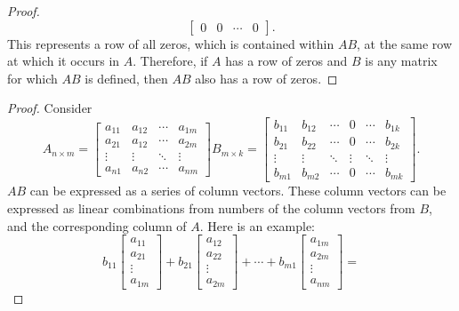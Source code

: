 \documentclass{article}
\begin{document}
\begin{enumerate}
{\begin{enumerate}
\begin{proof}
\[          \begin{bmatrix} 0 & 0 & \cdots & 0 \end{bmatrix}.
        \]
        This represents a row of all zeros, which is contained within $AB$, at the same row at which it occurs in $A$. Therefore, if $A$ has a row of zeros and $B$ is any matrix for which $AB$ is defined, then $AB$ also has a row of zeros.
      \end{proof}
      \begin{proof}
        Consider
        \[
          A_{n \times m} = \begin{bmatrix}
            a_{11} & a_{12} & \cdots & a_{1m} \\
            a_{21} & a_{12} & \cdots & a_{2m} \\
            \vdots & \vdots & \ddots & \vdots \\
            a_{n1} & a_{n2} & \cdots & a_{nm}
          \end{bmatrix}
          B_{m \times k} = \begin{bmatrix}
            b_{11} & b_{12} & \cdots & 0      & \cdots & b_{1k} \\
            b_{21} & b_{22} & \cdots & 0      & \cdots & b_{2k} \\
            \vdots & \vdots & \ddots & \vdots & \ddots & \vdots \\
            b_{m1} & b_{m2} & \cdots & 0      & \cdots & b_{mk}
          \end{bmatrix}.
        \]
        $AB$ can be expressed as a series of column vectors. These column vectors can be expressed as linear combinations from numbers of the column vectors from $B$, and the corresponding column of $A$. Here is an example:
        \[
          b_{11}\begin{bmatrix} a_{11} \\ a_{21} \\ \vdots \\ a_{1m}\end{bmatrix} +
          b_{21}\begin{bmatrix} a_{12} \\ a_{22} \\ \vdots \\ a_{2m}\end{bmatrix} + \cdots +
          b_{m1}\begin{bmatrix} a_{1m} \\ a_{2m} \\ \vdots \\ a_{nm}\end{bmatrix} =
\]
\end{proof}
\end{enumerate}}
\end{enumerate}
\end{document}
